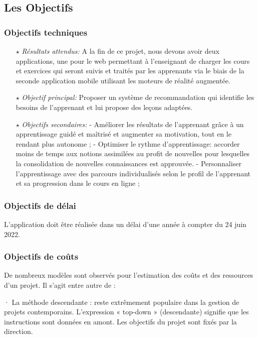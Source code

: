 \subsection{Les Objectifs}

\subsubsection{Objectifs techniques}
	\begin{itemize}
		\item[$\star$] \textit{Résultats attendus:}
		A la fin de ce projet, nous devons avoir deux applications, une pour le web permettant à l’enseignant de charger les cours et exercices qui seront suivis et traités par les apprenants via le biais de la seconde application mobile utilisant les moteurs de réalité augmentée.
		\item[$\star$] \textit{Objectif principal:} Proposer un système de recommandation qui identifie les besoins de l’apprenant et lui propose des leçons adaptées.
		\item[$\star$] \textit{Objectifs secondaires: } 
	- Améliorer les résultats de l’apprenant grâce à un apprentissage guidé et maîtrisé et augmenter sa motivation, tout en le rendant plus autonome ;
	- Optimiser le rythme d’apprentissage: accorder moins de temps aux notions assimilées au profit de nouvelles pour lesquelles la consolidation de nouvelles connaissances est approuvée.
	- Personnaliser l’apprentissage avec des parcours individualisés selon le profil de l’apprenant et sa progression dans le cours en ligne ; 
	\end{itemize}
	
\subsubsection{Objectifs de délai}
	L’application doit être réalisée dans un délai d’une année à compter du 24 juin 2022. 
\subsubsection{Objectifs de coûts}
	De nombreux modèles sont observés pour l’estimation des coûts et des ressources d’un projet. Il s’agit entre autre de :
	
\noindent

·   La méthode descendante : reste extrêmement populaire dans la gestion de projets contemporains. L'expression « top-down » (descendante) signifie que les instructions sont données en amont. Les objectifs du projet sont fixés par la direction. 
\noindent

